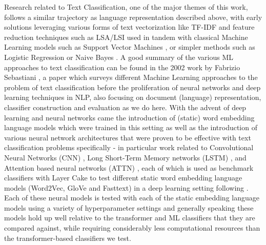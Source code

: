\documentclass[final]{clv2025-revised}
\begin{document}
Research related to Text Classification, one of the major themes of this work, follows a similar trajectory as language representation described above, with early solutions leveraging various forms of text vectorization like TF-IDF \cite{sparckjones1972statistical} and feature reduction techniques such as LSA/LSI \cite{deerwester} used in tandem with classical Machine Learning models such as Support Vector Machines \cite{joachims1998text}, or simpler methods such as Logistic Regression or Naive Bayes \cite{mccallum1998comparison}. A good summary of the various ML approaches to text classification can be found in the 2002 work by Fabrizio Sebastiani \cite{sebastiani2002machine}, a paper which surveys different Machine Learning approaches to the problem of text classification before the proliferation of neural networks and deep learning techniques in NLP, also focusing on document (language) representation, classifier construction and evaluation as we do here. With the advent of deep learning and neural networks came the introduction of (static) word embedding language models which were trained in this setting as well as the introduction of various neural network architectures that were proven to be effective with text classification problems specifically - in particular work related to Convolutional Neural Networks (CNN) \cite{yoon2014convolutional} \cite{zhang2015character}, Long Short-Term Memory networks (LSTM) \cite{zang2021research}, and Attention based neural networks (ATTN) \cite{liuguo2019bidirectional}, each of which is used as benchmark classifiers with Layer Cake to test different static word embedding language models (Word2Vec, GloVe and Fasttext) in a deep learning setting following \cite{moreo2021}. Each of these neural models is tested with each of the static embedding language models using a variety of hyperparameter settings and generally speaking these models hold up well relative to the transformer and ML classifiers that they are compared against, while requiring considerably less computational resources than the transformer-based classifiers we test.
\end{document}
